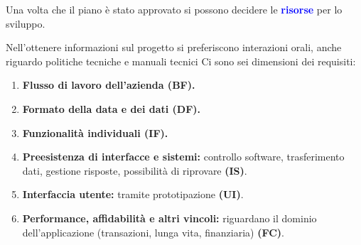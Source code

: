 Una volta che il piano è stato approvato si possono decidere le \textbf{\textcolor{blue}{risorse}} per lo sviluppo.

\vspace*{0.02\textheight}
Nell'ottenere informazioni sul progetto si preferiscono interazioni orali, anche riguardo politiche tecniche e manuali tecnici
Ci sono sei dimensioni dei requisiti:
\begin{enumerate}
    \item \textbf{Flusso di lavoro dell'azienda (\textcolor{forest_green}{BF}).}
    \item \textbf{Formato della data e dei dati (\textcolor{forest_green}{DF}).}
    \item \textbf{Funzionalità individuali (\textcolor{forest_green}{IF}).}
    \item \textbf{Preesistenza di interfacce e sistemi:} controllo software, trasferimento dati, gestione risposte, possibilità di riprovare \textbf{(\textcolor{forest_green}{IS})}.
    \item \textbf{Interfaccia utente:} tramite prototipazione \textbf{(\textcolor{forest_green}{UI})}.
    \item \textbf{Performance, affidabilità e altri vincoli:} riguardano il dominio dell'applicazione (transazioni, lunga vita, finanziaria) \textbf{(\textcolor{forest_green}{FC})}.
\end{enumerate}

